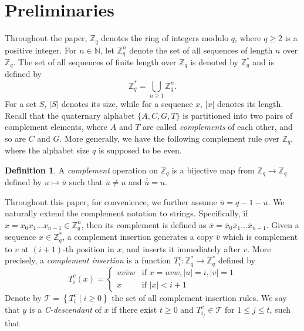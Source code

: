 \documentclass[pdflatex,sn-mathphys-num]{sn-jnl}
\theoremstyle{theorem}%
\theoremstyle{definition}
\newtheorem{definition}{Definition}
\theoremstyle{construction}
\newtheorem{open problem}{Open problem}
\begin{document}
	\section{Preliminaries} \label{sec:2}
	Throughout the paper, $\mathbb{Z} _{q}$ denotes the ring of integers modulo $q$, where $q\geq 2$ is a positive integer. For $n\in \mathbb{N}$, let $\mathbb{Z}_q^n$ denote the set of all sequences of length $n$ over $\mathbb{Z}_q$. 
	The set of all sequences of finite length over $\mathbb{Z}_q$ is denoted by $\mathbb{Z}_q^{*} $ and is defined by
	\[
	\mathbb{Z}_q^{*} = \bigcup_{n \geq 1} \mathbb{Z}_q^n.
	\]
	For a set $S$, $|S|$ denotes its size, while for a sequence $x$, $|x|$ denotes its length. Recall that the quaternary alphabet $ \{A, C, G, T\} $ is partitioned into two pairs of complement elements, where $A$ and $T$ are called \emph{complements} of each other, and so are $C$ and $G$. More generally, we have the following complement rule over $\mathbb{Z} _{q}$, where the alphabet size $q$ is supposed to be even.
	\begin{definition}
		A \textit{complement} operation on $\mathbb{Z} _{q}$ is a bijective map from $\mathbb{Z} _{q} \longrightarrow \mathbb{Z} _{q}$ defined by $u \mapsto \overline{u}$ such that $\overline{u} \ne u$ and $\overline{\overline{u}}=u$. 
	\end{definition}
	Throughout this paper, for convenience, we further assume $\overline{u}=q-1-u$. We naturally extend the complement notation to strings. Specifically, if 
	$x = x_0x_1\ldots x_{n-1} \in \mathbb{Z}_q^n$, then its complement is defined as 
	$\bar{x} = \bar{x}_0 \bar{x}_1 \ldots \bar{x}_{n-1}$. Given a sequence $x\in \mathbb{Z}_{q}^{*}$, a complement insertion generates a copy $\overline{v}$ which is complement to $v$ at $(i+1)$-th position in $x$, and inserts it immediately after $v$. More precisely, a \textit{complement insertion} is a function $T^{c}_{i} : \mathbb{Z}_{q}^{*} \longrightarrow \mathbb{Z}_{q}^{*}$ defined by
		\begin{equation}
		T^{c}_{i}(x)=
		\begin{cases} 
			uv\overline{v}w & \text{if } x =uvw , |u| = i, |v| = 1 \\ 
			x & \text{if } |x| < i + 1
		\end{cases}	
		\end{equation}		
	Denote by $\mathcal{T}= \left \{T^{c}_{i} \mid i\ge0 \right \}   $  the set of all complement insertion rules. We say that $y$ is a \emph{C-descendant} of $x$ if there exist $t \geq 0$ and $T^{c}_{i_{j}}\in \mathcal{T}  $ for $1\le j \le t$, such that
\end{document}
